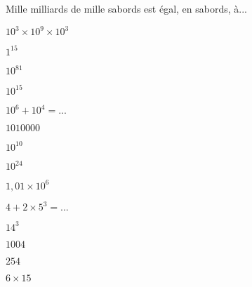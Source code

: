 \begin{QCM}
\begin{GroupeQCM}
\begin{exercice}
Mille milliards de mille sabords est égal, en sabords, à...
\begin{ChoixQCM}{4}
\item $10^3 \times 10^9 \times 10^3$
\item $1^{15}$
\item $10^{81}$
\item $10^{15}$
\end{ChoixQCM}
\begin{corrige}
\end{corrige}
\end{exercice}

\begin{exercice}
$10^6 + 10^4 = ...$
\begin{ChoixQCM}{4}
\item $1 010 000$
\item $10^{10}$
\item $10^{24}$
\item $1,01\times 10^6$
\end{ChoixQCM}
\begin{corrige}
\end{corrige}
\end{exercice}

\begin{exercice}
$4 + 2 \times 5^3 = ...$
\begin{ChoixQCM}{4}
\item $14^3$
\item $1 004$
\item $254$
\item $6 \times 15$
\end{ChoixQCM}
\begin{corrige}
\end{corrige}
\end{exercice}

\end{GroupeQCM}
\end{QCM}
